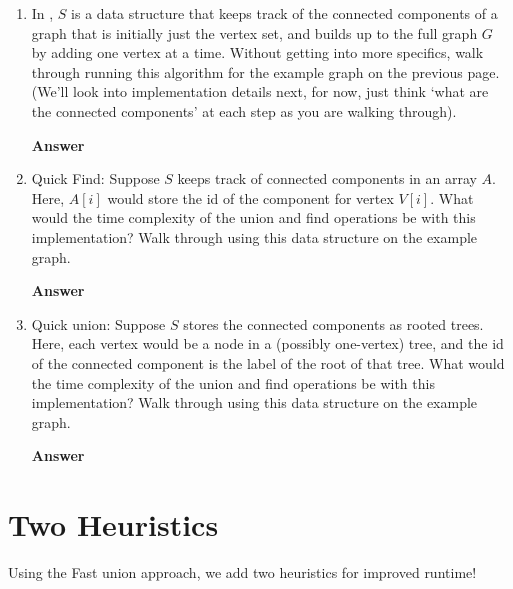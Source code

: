\documentclass{article}
\begin{document}
\begin{enumerate}

    \item In , $S$ is a data structure that keeps track of
        the connected components of a graph that is initially just the vertex
        set, and builds up to the full graph $G$ by adding one vertex at a time.
        Without getting into more specifics, walk through running this algorithm
        for the example graph on the previous page. (We'll look into
        implementation details next, for now, just think `what are the connected
        components' at each step as you are walking through).

        \textbf{Answer}
        \vspace{3in}

    \newpage
    \item Quick Find: Suppose $S$ keeps track of connected components in an array $A$. Here,
        $A[i]$ would store the id of the component for vertex $V[i]$. What would
        the time complexity of the union and find operations be with this
        implementation? Walk through using this data structure on the example
        graph.

        \textbf{Answer}
        \vspace{3in}

    \item Quick union: Suppose $S$ stores the connected components as rooted
        trees.  Here, each vertex would be a node in a (possibly one-vertex)
        tree, and the id of the connected component is the label of the root of
        that tree. What would the time complexity of the union and find
        operations be with this implementation? Walk through using this data
        structure on the example graph.

        \textbf{Answer}
        \vspace{3in}

\end{enumerate}


\section*{Two Heuristics}

Using the Fast union approach, we add two heuristics for improved runtime!
\end{document}
